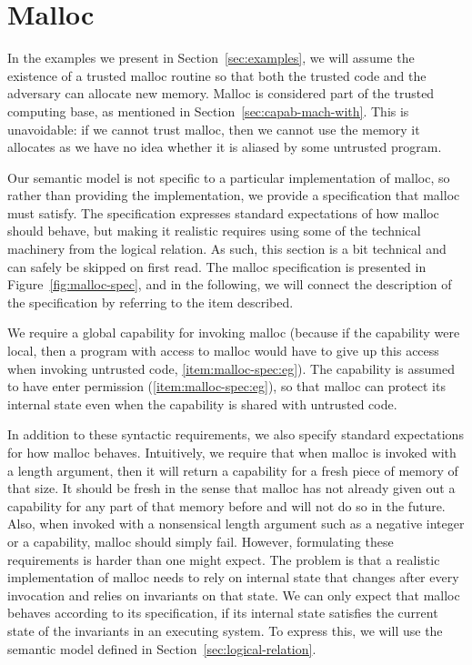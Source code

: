 \documentclass[format=acmsmall, review=true, screen=true]{acmart}
\renewcommand{\figurename}{Figure}
\renewcommand{\sectionname}{Section}
\newenvironment{toplas}%
    {\color{OliveGreen}}{}
\begin{document}
\begin{toplas}
  \section{Malloc}
  \label{sec:malloc}
  In the examples we present in \sectionname~\ref{sec:examples}, we will assume
  the existence of a trusted malloc routine so that both the trusted code and
  the adversary can allocate new memory. Malloc is considered part of the
  trusted computing base, as mentioned in
  \sectionname~\ref{sec:capab-mach-with}. This is unavoidable: if we cannot
  trust malloc, then we cannot use the memory it allocates as we have no idea
  whether it is aliased by some untrusted program.

  Our semantic model is not specific to a particular implementation of malloc,
  so rather than providing the implementation, we provide a specification that
  malloc must satisfy. The specification expresses standard expectations of how
  malloc should behave, but making it realistic requires using some of the
  technical machinery from the logical relation. As such, this section is a bit
  technical and can safely be skipped on first read. The malloc specification is
  presented in \figurename~\ref{fig:malloc-spec}, and in the following, we will
  connect the description of the specification by referring to the item
  described.

We require a global capability for
invoking malloc (because if the capability were local, then a program with
access to malloc would have to give up this access when invoking untrusted
code, \ref{item:malloc-spec:eg}). The capability is assumed to have enter
permission (\ref{item:malloc-spec:eg}), so that malloc can
protect its internal state even when the capability is shared with untrusted
code.

In addition to these syntactic requirements, we also specify standard
expectations for how malloc behaves. Intuitively, we require that when malloc is
invoked with a length argument, then it will return a capability for a fresh
piece of memory of that size. It should be fresh in the sense that malloc has
not already given out a capability for any part of that memory before and will
not do so in the future. Also, when invoked with a nonsensical length argument
such as a negative integer or a capability, malloc should simply fail. However,
formulating these requirements is harder than one might expect. The problem is
that a realistic implementation of malloc needs to rely on internal state that
changes after every invocation and relies on invariants on that state. We can
only expect that malloc behaves according to its specification, if its internal
state satisfies the current state of the invariants in an executing system. To
express this, we will use the semantic model defined in
Section~\ref{sec:logical-relation}.


\end{toplas}
\end{document}
